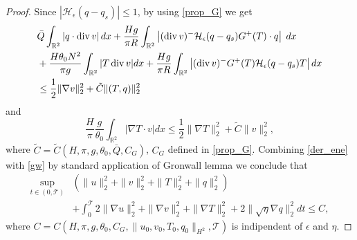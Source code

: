 \documentclass[10pt,a4paper]{amsart}
\DeclareMathOperator{\dive}{div}
\begin{document}
\begin{proof}
Since $\left| \mathcal{H}_\epsilon (q-q_s)\right|\leq 1$, by using \eqref{prop_G} we get
\begin{equation}\label{gw}
    \begin{aligned}
        &\bar{Q} \int_{\mathbb{R}^2} \left| q \cdot \dive v \right| dx +   \frac{Hg}{\pi R} \int_{\mathbb{R}^2} \left| (\dive v)^-\mathcal{H}_{\epsilon}(q-q_s) G^+(T)  \cdot q \right|\; dx \\
        & + \frac{H \theta_0 N^2}{\pi g} \int_{\mathbb{R}^2} |T \dive v| dx+ \frac{Hg}{\pi R}\int_{\mathbb{R}^2} \left|(\dive v)^- G^+(T)\mathcal{H}_\epsilon(q-q_s) T\right| dx \\
        & \leq   \frac{1}{2} \|\nabla v\|_2^2 +  \Tilde{C} \|(T,q)\|_2^2
    \end{aligned}
\end{equation}
and 
\begin{equation}\label{5.7}
    \frac{H}{\pi} \frac{g}{\theta_0} \int_{\mathbb{R}^2} |\nabla T  \cdot v |dx \leq \frac{1}{2} \|\nabla T\|_2^2 + \tilde{C}\|v\|_2^2,
\end{equation}
where $\tilde{C}= \tilde{C}(H, \pi,g,\theta_0, \bar{Q}, C_G)$, $C_G$ defined in \eqref{prop_G}. Combining  \eqref{der_ene} with \eqref{gw} by standard application of Gronwall lemma we conclude that
\begin{equation*}
    \begin{aligned}
        \sup_{t \in (0, \mathcal{T})} & \left(\|u\|_2^2 + \|v\|_2^2 +  \|T\|_2^2 + \|q\|_2^2 \right)  \\
        & + \int_0^{\mathcal{T}} 2\|\nabla u\|_2^2 + \|\nabla v\|_2^2 + \|\nabla T\|_2^2 + 2\|\sqrt{\eta} \nabla q\|_2^2 dt \leq C, 
    \end{aligned}
\end{equation*}
where $C=C(H,\pi,g,\theta_0,C_G, \|u_0,v_0,T_{0},q_0\|_{H^2},\mathcal{T})$ is indipendent of $\epsilon$ and $\eta$. 
\end{proof}
\end{document}
